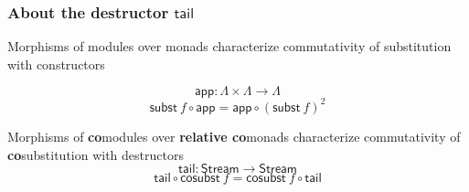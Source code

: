 \documentclass[
]
{beamer}
\newcommand{\constfont}[1]{\ensuremath{\mathsf{#1}}}
\newcommand{\bind}[2]{{#1}\mathbin{\gg\hspace{-.8ex}=}{#2}}
\newcommand{\stream}{\constfont{Stream}}
\newcommand{\stail}{\constfont{tail}}
\newcommand{\cosubst}{\constfont{cosubst}}
\newcommand{\comp}[2]{\ensuremath{{#2} \circ {#1}}}
\newcommand{\shift}{\constfont{shift}}
\newcommand{\subst}{\constfont{subst}}
\newcommand{\App}{\constfont{app}}
\newcommand{\Abs}{\constfont{abs}}
\newcommand{\LC}{{\Lambda}}
\newcommand{\fat}[1]{\textbf{#1}}
\begin{document}
\begin{frame}
 \frametitle{About the destructor $\stail$}
 
 \begin{block}{Morphisms of modules over monads}
   characterize commutativity of substitution with constructors

         \[ \App : \LC\times\LC \to \LC \]
         \[ \comp{\App}{\subst~f} = \comp{(\subst~f)^2}{\App} \]

 \end{block}

 \begin{block}{Morphisms of \fat{co}modules over \fat{relative co}monads}
   characterize commutativity of \fat{co}substitution with destructors
         \[\stail : \stream \to \stream\]
          \[ \comp{\cosubst~f}{\stail} = \comp{\stail}{\cosubst~f} \]
 \end{block} 
 
\end{frame}

%  
% 
%  
% 
%  
\end{document}
